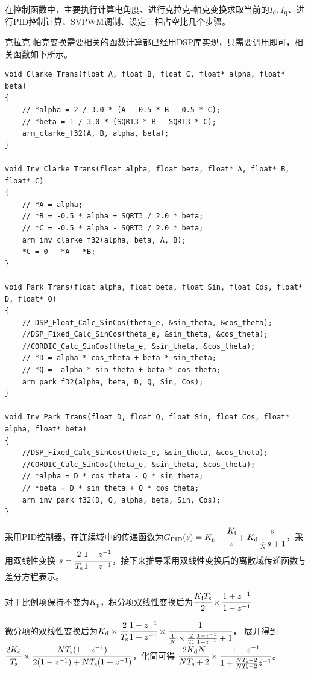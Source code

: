 在控制函数中，主要执行计算电角度、进行克拉克-帕克变换求取当前的\(I_{\mathrm{d}},I_{\mathrm{q}}\)、进行PID控制计算、SVPWM调制、设定三相占空比几个步骤。

克拉克-帕克变换需要相关的函数计算都已经用DSP库实现，只需要调用即可，相关函数如下所示。

\begin{lstlisting}
void Clarke_Trans(float A, float B, float C, float* alpha, float* beta)
{
    // *alpha = 2 / 3.0 * (A - 0.5 * B - 0.5 * C);
    // *beta = 1 / 3.0 * (SQRT3 * B - SQRT3 * C);
    arm_clarke_f32(A, B, alpha, beta);
}

void Inv_Clarke_Trans(float alpha, float beta, float* A, float* B, float* C)
{
    // *A = alpha;
    // *B = -0.5 * alpha + SQRT3 / 2.0 * beta;
    // *C = -0.5 * alpha - SQRT3 / 2.0 * beta;
    arm_inv_clarke_f32(alpha, beta, A, B);
    *C = 0 - *A - *B;
}

void Park_Trans(float alpha, float beta, float Sin, float Cos, float* D, float* Q)
{
    // DSP_Float_Calc_SinCos(theta_e, &sin_theta, &cos_theta);
    //DSP_Fixed_Calc_SinCos(theta_e, &sin_theta, &cos_theta);
    //CORDIC_Calc_SinCos(theta_e, &sin_theta, &cos_theta);
    // *D = alpha * cos_theta + beta * sin_theta;
    // *Q = -alpha * sin_theta + beta * cos_theta;
    arm_park_f32(alpha, beta, D, Q, Sin, Cos);
}

void Inv_Park_Trans(float D, float Q, float Sin, float Cos, float* alpha, float* beta)
{
    //DSP_Fixed_Calc_SinCos(theta_e, &sin_theta, &cos_theta);
    //CORDIC_Calc_SinCos(theta_e, &sin_theta, &cos_theta);
    // *alpha = D * cos_theta - Q * sin_theta;
    // *beta = D * sin_theta + Q * cos_theta;
    arm_inv_park_f32(D, Q, alpha, beta, Sin, Cos);
}
\end{lstlisting}

采用PID控制器。在连续域中的传递函数为\(G_{\mathrm{PID}}(s)=K_{\mathrm{p}}+\cfrac{K_{\mathrm{i}}}{s}+K_{\mathrm{d}}\cfrac{s}{\frac 1N s+1}\)，采用双线性变换
\(s=\cfrac{2}{T_{\mathrm{s}}}\cfrac{1-z^{-1}}{1+z^{-1}}\)，接下来推导采用双线性变换后的离散域传递函数与差分方程表示。

对于比例项保持不变为\(K_{\mathrm{p}}\)，积分项双线性变换后为\(\cfrac{K_{\mathrm{i}}T_{\mathrm{s}}}{2}\times\cfrac{1+z^{-1}}{1-z^{-1}}\)

微分项的双线性变换后为\(K_{\mathrm{d}}\times\cfrac{2}{T_{\mathrm{s}}}\cfrac{1-z^{-1}}{1+z^{-1}}\times\cfrac{1}{\frac{1}{N}\times
\frac{2}{T_{\mathrm{s}}}\frac{1-z^{-1}}{1+z^{-1}}+1}\)，
展开得到\(\cfrac{2K_{\mathrm{d}}}{T_{\mathrm{s}}}\times\cfrac{NT_{\mathrm{s}}(1-z^{-1})}{2(1-z^{-1})+NT_{\mathrm{s}}(1+z^{-1})}\)，化简可得
\(\cfrac{2K_{\mathrm{d}}N}{NT_{\mathrm{s}}+2}\times\cfrac{1-z^{-1}}{1+\frac{NT_{\mathrm{s}}-2}{NT_{\mathrm{s}}+2}z^{-1}}\)。

